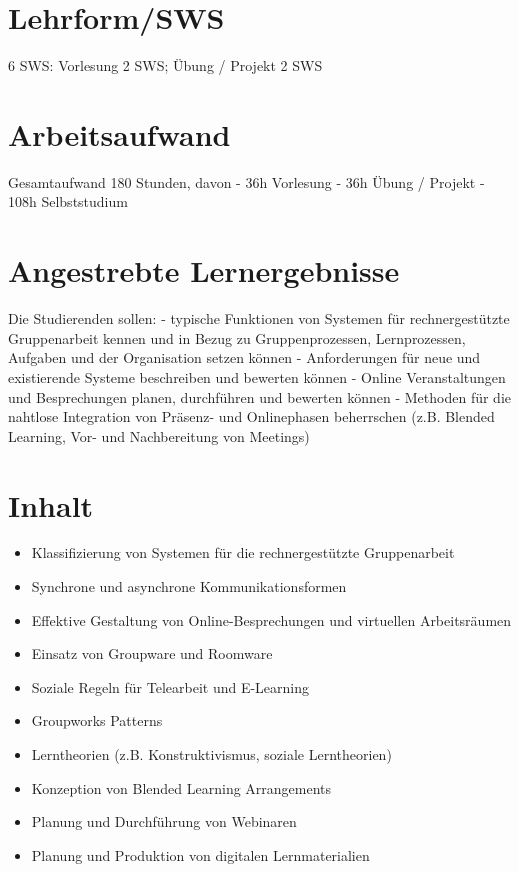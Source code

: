 \section*{Lehrform/SWS\label{/mi-2017/modulbeschreibungen-master/MA_SC_WPF_CSCL}}\label{lehrformswspathlabelmi-2017modulbeschreibungen-mastermaux5fscux5fwpfux5fcscl}

6 SWS: Vorlesung 2 SWS; Übung / Projekt 2 SWS

\section*{Arbeitsaufwand\label{/mi-2017/modulbeschreibungen-master/MA_SC_WPF_CSCL}}\label{arbeitsaufwandpathlabelmi-2017modulbeschreibungen-mastermaux5fscux5fwpfux5fcscl}

Gesamtaufwand 180 Stunden, davon - 36h Vorlesung - 36h Übung / Projekt -
108h Selbststudium

\section*{Angestrebte
Lernergebnisse\label{/mi-2017/modulbeschreibungen-master/MA_SC_WPF_CSCL}}\label{angestrebte-lernergebnissepathlabelmi-2017modulbeschreibungen-mastermaux5fscux5fwpfux5fcscl}

Die Studierenden sollen: - typische Funktionen von Systemen für
rechnergestützte Gruppenarbeit kennen und in Bezug zu Gruppenprozessen,
Lernprozessen, Aufgaben und der Organisation setzen können -
Anforderungen für neue und existierende Systeme beschreiben und bewerten
können - Online Veranstaltungen und Besprechungen planen, durchführen
und bewerten können - Methoden für die nahtlose Integration von Präsenz-
und Onlinephasen beherrschen (z.B. Blended Learning, Vor- und
Nachbereitung von Meetings)

\section*{Inhalt\label{/mi-2017/modulbeschreibungen-master/MA_SC_WPF_CSCL}}\label{inhaltpathlabelmi-2017modulbeschreibungen-mastermaux5fscux5fwpfux5fcscl}

\begin{itemize}
\tightlist
\item
  Klassifizierung von Systemen für die rechnergestützte Gruppenarbeit
\item
  Synchrone und asynchrone Kommunikationsformen
\item
  Effektive Gestaltung von Online-Besprechungen und virtuellen
  Arbeitsräumen
\item
  Einsatz von Groupware und Roomware
\item
  Soziale Regeln für Telearbeit und E-Learning
\item
  Groupworks Patterns
\item
  Lerntheorien (z.B. Konstruktivismus, soziale Lerntheorien)
\item
  Konzeption von Blended Learning Arrangements
\item
  Planung und Durchführung von Webinaren
\item
  Planung und Produktion von digitalen Lernmaterialien
\end{itemize}

